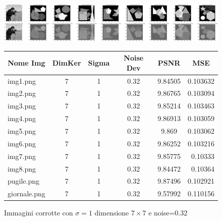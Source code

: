 \begin{figure}[H]
    \centering
    \begin{minipage}[h]{\textwidth}
    \includegraphics[width=\linewidth]{output/tabCorrotte/imgcorr10.png}\label{fig:imgcorrotte7x70.32}
    \end{minipage}
    \begin{minipage}[h]{\textwidth}
        \centering
        
        \begin{tabular}{|l c c c c r|}
            \hline
            \multicolumn{1}{|c}{\textbf{Nome Img}} & \multicolumn{1}{|c}{\textbf{DimKer}} & \multicolumn{1}{|c}{\textbf{Sigma}} & \multicolumn{1}{|c}{\textbf{Noise Dev}} & \multicolumn{1}{|c}{\textbf{PSNR}} & \multicolumn{1}{|c|}{\textbf{MSE}} \\ \hline
                img1.png & 7 & 1 & 0.32 & 9.84505 & 0.103632 \\ 
                img2.png & 7 & 1 & 0.32 & 9.86765 & 0.103094 \\
                img3.png & 7 & 1 & 0.32 & 9.85214 & 0.103463 \\
                img4.png & 7 & 1 & 0.32 & 9.86913 & 0.103059 \\
                img5.png & 7 & 1 & 0.32 & 9.869 & 0.103062 \\
                img6.png & 7 & 1 & 0.32 & 9.86252 & 0.103216 \\ 
                img7.png & 7 & 1 & 0.32 & 9.85775 & 0.10333 \\
                img8.png & 7 & 1 & 0.32 & 9.84472 & 0.10364 \\ 
                pugile.png & 7 & 1 & 0.32 & 9.87496 & 0.102921 \\
                giornale.png & 7 & 1 & 0.32 & 9.57992 & 0.110156 \\\hline
            \end{tabular}\label{tab:tabcorrotte7x70.32}   
        
        \end{minipage}
    \captionsetup{labelformat=andtable}
    \caption{Immagini corrotte con $\sigma = 1$ dimensione $7 \times 7$ e noise=0.32}
\end{figure}

